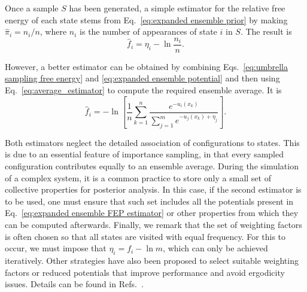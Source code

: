 \documentclass[aip,jcp,reprint,amsmath,amssymb]{revtex4-1}
\begin{document}
Once a sample $S$ has been generated, a simple estimator for the relative free energy of each state stems from Eq.~\eqref{eq:expanded ensemble prior} by making $\hat \pi_i = n_i/n$, where $n_i$ is the number of appearances of state $i$ in $S$. The result is
\begin{equation}
\label{eq:expanded ensemble histogram estimator}
\hat f_i = \eta_i - \ln \frac{n_i}{n}.
\end{equation}

However, a better estimator can be obtained by combining Eqs.~\eqref{eq:umbrella sampling free energy} and \eqref{eq:expanded ensemble potential} and then using Eq.~\eqref{eq:average_estimator} to compute the required ensemble average. It is
\begin{equation}
\label{eq:expanded ensemble FEP estimator}
\hat f_i = -\ln \left[ \frac{1}{n}\sum_{k=1}^n \frac{e^{-u_i(x_k)}}{\sum_{j=1}^m e^{-u_j(x_k) + \eta_j}} \right].
\end{equation}

Both estimators neglect the detailed association of configurations to states. This is due to an essential feature of importance sampling, in that every sampled configuration contributes equally to an ensemble average. During the simulation of a complex system, it is a common practice to store only a small set of collective properties for posterior analysis. In this case, if the second estimator is to be used, one must ensure that such set includes all the potentials present in Eq.~\eqref{eq:expanded ensemble FEP estimator} or other properties from which they can be computed afterwards. Finally, we remark that the set of weighting factors is often chosen so that all states are visited with equal frequency. For this to occur, we must impose that $\eta_i = f_i - \ln m$, which can only be achieved iteratively. Other strategies have also been proposed to select suitable weighting factors or reduced potentials that improve performance and avoid ergodicity issues. Details can be found in Refs.~.



\end{document}

